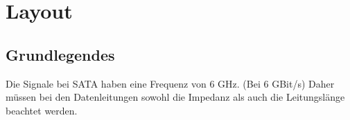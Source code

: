 
\section{Layout}

\subsection{Grundlegendes}
Die Signale bei SATA haben eine Frequenz von 6 GHz. (Bei 6 GBit/s)
Daher müssen bei den Datenleitungen sowohl die Impedanz als auch die 
Leitungslänge beachtet werden. 
